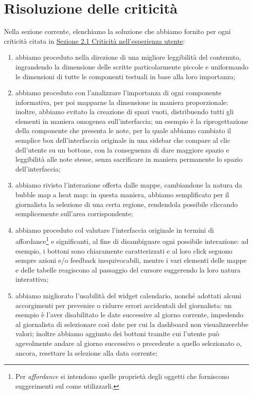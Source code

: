 \documentclass[../../main.tex]{subfiles}
\begin{document}
\section{Risoluzione delle criticità}
Nella sezione corrente, elenchiamo la soluzione che abbiamo fornito per ogni criticità citata in \hyperref[ss:criticita]{Sezione 2.1 Criticità nell’esperienza utente}:
\begin{enumerate}
    \item [{\hyperref[el:1]{1.}}] abbiamo proceduto nella direzione di una migliore leggibilità del contenuto, ingrandendo la dimensione delle scritte particolarmente piccole e uniformando le dimensioni di tutte le componenti testuali in base alla loro importanza;
    \item [{\hyperref[el:2]{2.}}] abbiamo proceduto con l'analizzare l'importanza di ogni componente informativa, per poi mapparne la dimensione in maniera proporzionale: inoltre, abbiamo evitato la creazione di spazi vuoti, distribuendo tutti gli elementi in maniera omogenea sull'interfaccia; un esempio è la riprogettazione della componente che presenta le note, per la quale abbiamo cambiato il semplice box dell'interfaccia originale in una sidebar che compare al clic dell'utente su un bottone, con la conseguenza di dare maggiore spazio e leggibilità alle note stesse, senza sacrificare in maniera permanente lo spazio dell'interfaccia;
    \item [{\hyperref[el:3]{3.}}] abbiamo rivisto l'interazione offerta dalle mappe, cambiandone la natura da bubble map a heat map: in questa maniera, abbiamo semplificato per il giornalista la selezione di una certa regione, rendendola possibile cliccando semplicemente sull'area corrispondente;
    \item [{\hyperref[el:4]{4.}}] abbiamo proceduto col valutare l'interfaccia originale in termini di affordance\footnote{Per \textit{affordance} si intendono quelle proprietà degli oggetti che forniscono suggerimenti sul come utilizzarli.} e significanti, al fine di disambiguare ogni possibile interazione: ad esempio, i bottoni sono chiaramente caratterizzati e al loro click seguono sempre azioni e/o feedback inequivocabili, mentre i vari elementi delle mappe e delle tabelle reagiscono al passaggio del cursore suggerendo la loro natura interattiva;
    \item [{\hyperref[el:5]{5.}}] abbiamo migliorato l'usabilità del widget calendario, nonché adottati alcuni accorgimenti per prevenire o ridurre errori accidentali del giornalista: un esempio è l'aver disabilitato le date successive al giorno corrente, impedendo al giornalista di selezionare così date per cui la dashboard non visualizzerebbe valori; inoltre abbiamo aggiunto dei bottoni tramite cui l'utente può agevolmente andare al giorno successivo o precedente a quello selezionato o, ancora, resettare la selezione alla data corrente;

\end{enumerate}
\end{document}
